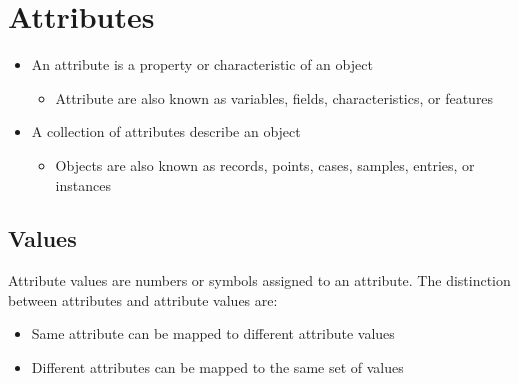 \section{Attributes}
\begin{itemize}
    \item An attribute is a property or characteristic of an object
    \begin{itemize}
        \item Attribute are also known as variables, fields, characteristics, or features
    \end{itemize}
    \item A collection of attributes describe an object
    \begin{itemize}
        \item Objects are also known as records, points, cases, samples, entries, or instances
    \end{itemize}
\end{itemize}

\subsection{Values}
Attribute values are numbers or symbols assigned to an attribute.
The distinction between attributes and attribute values are:
\begin{itemize}
    \item Same attribute can be mapped to different attribute values
    \item Different attributes can be mapped to the same set of values
\end{itemize}

